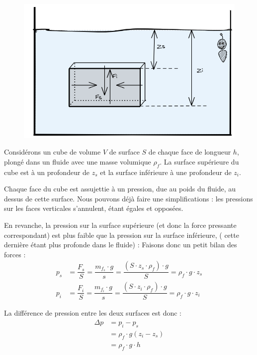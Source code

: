 \documentclass[11pt,a4paper]{article}
\begin{document}
\begin{figure}
\centering
\includegraphics[width=0.95\linewidth]{imgs/p9/archimede2.png}
\caption{}
\label{fig:archimede}
\end{figure}
Considérons un cube de volume $V$ de surface $S$ de chaque face de longueur $h$, plongé dans un fluide avec une masse volumique $\rho_f$. La surface supérieure du cube est à un profondeur de $z_s$ et la surface inférieure à une profondeur de $z_i$.

Chaque face du cube est assujettie à un pression, due au poids du fluide, au dessus de cette surface. Nous pouvons déjà faire une simplifications : les pressions sur les faces verticales s'annulent, étant égales et opposées. 

En revanche, la pression sur la surface supérieure (et donc la force pressante correspondant) est plus faible que la pression sur la surface inférieure, ( cette dernière étant plus profonde dans le fluide) : 
\newpage
Faisons donc un petit bilan des forces : 
\begin{align*}
    p_s &= \dfrac{F_s}{S} = \dfrac{m_f_s\cdot g}{s} = \dfrac{\left(S\cdot z_s\cdot\rho_f\right)\cdot g}{S} =\rho_f\cdot g\cdot z_s\\
    p_i &= \dfrac{F_i}{S} = \dfrac{m_f_i\cdot g}{s} = \dfrac{\left(S\cdot z_i\cdot\rho_f\right)\cdot g}{S} =\rho_f\cdot g\cdot z_i
\end{align*}

La différence de pression entre les deux surfaces est donc : 
\begin{align*}
    \Delta p &= p_i - p_s \\
        &= \rho_f\cdot g\left(z_i - z_s\right) \tag{1}\\
        &=\rho_f\cdot g\cdot h
\end{align*}
\end{document}
